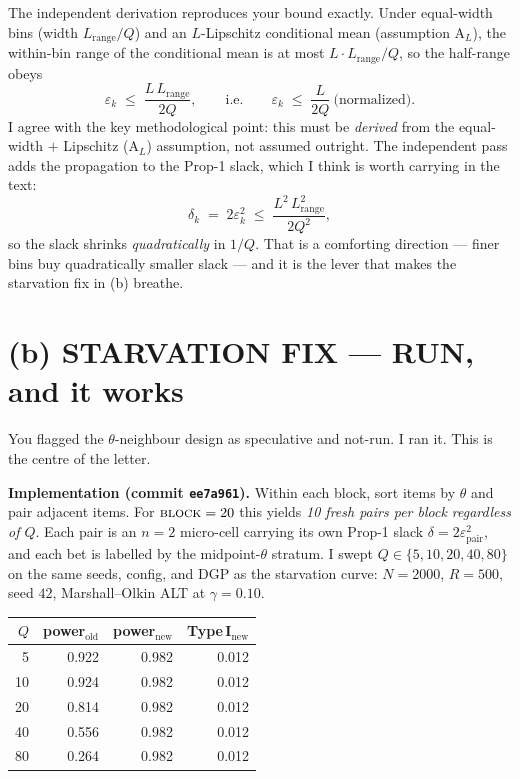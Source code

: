 \documentclass[11pt,a4paper]{article}
\begin{document}
\noindent The independent derivation reproduces your bound exactly. Under
equal-width bins (width $L_{\mathrm{range}}/Q$) and an $L$-Lipschitz conditional
mean (assumption $\mathrm{A}_L$), the within-bin range of the conditional mean is
at most $L \cdot L_{\mathrm{range}}/Q$, so the half-range obeys
\[
  \varepsilon_k \;\le\; \frac{L\,L_{\mathrm{range}}}{2Q},
  \qquad\text{i.e.}\qquad
  \varepsilon_k \;\le\; \frac{L}{2Q}\ \text{(normalized).}
\]
I agree with the key methodological point: this must be \emph{derived} from the
equal-width $+$ Lipschitz ($\mathrm{A}_L$) assumption, not assumed outright.
The independent pass adds the propagation to the Prop-1 slack, which I think is
worth carrying in the text:
\[
  \delta_k \;=\; 2\varepsilon_k^2
  \;\le\; \frac{L^2\,L_{\mathrm{range}}^2}{2Q^2},
\]
so the slack shrinks \emph{quadratically} in $1/Q$. That is a comforting
direction --- finer bins buy quadratically smaller slack --- and it is the lever
that makes the starvation fix in (b) breathe.

\section*{(b) STARVATION FIX --- RUN, and it works}

\noindent You flagged the $\theta$-neighbour design as speculative and
not-run. I ran it. This is the centre of the letter.

\medskip
\noindent\textbf{Implementation (commit \texttt{ee7a961}).} Within each block,
sort items by $\theta$ and pair adjacent items. For $\textsc{block} = 20$ this
yields \emph{10 fresh pairs per block regardless of $Q$}. Each pair is an $n = 2$
micro-cell carrying its own Prop-1 slack $\delta = 2\varepsilon_{\mathrm{pair}}^2$,
and each bet is labelled by the midpoint-$\theta$ stratum. I swept
$Q \in \{5, 10, 20, 40, 80\}$ on the same seeds, config, and DGP as the
starvation curve: $N = 2000$, $R = 500$, seed $42$, Marshall--Olkin ALT at
$\gamma = 0.10$.

\medskip
\begin{center}
\setlength{\tabcolsep}{9pt}
\begin{tabular}{rrrr}
\toprule
$Q$ & power$_{\text{old}}$ & power$_{\text{new}}$ & Type\,I$_{\text{new}}$ \\
\midrule
 5 & 0.922 & 0.982 & 0.012 \\
10 & 0.924 & 0.982 & 0.012 \\
20 & 0.814 & 0.982 & 0.012 \\
40 & 0.556 & 0.982 & 0.012 \\
80 & 0.264 & 0.982 & 0.012 \\
\bottomrule
\end{tabular}
\end{center}
\medskip
\end{document}
